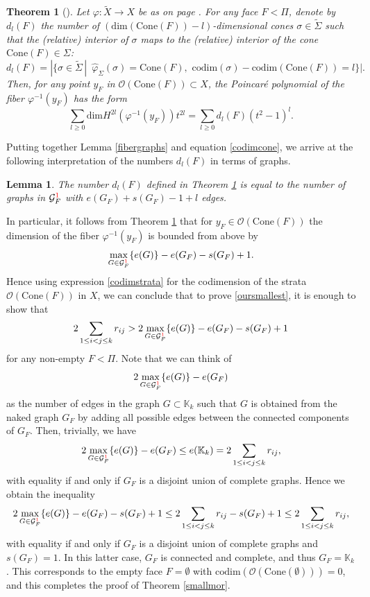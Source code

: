\documentclass[11pt]{article}
\newtheorem{theorem}[theo]{Theorem}
\newtheorem{lemma}[theo]{Lemma}
\theoremstyle{definition}
\numberwithin{equation}{section}
\newcommand{\cone}{\mathrm{Cone}}
\newcommand{\tilS}{\widetilde{\Sigma}}
\begin{document}
\begin{theorem}[{\cite[Corollary 4.7]{dCMMtor}}]\label{PoincareFib}
Let $\varphi: \widetilde{X}\to X$ be as on page \pageref{omitnot}. For any face 
$F<\Pi$, denote by
$d_l(F)$  the number of $(\mathrm{dim}(\cone(F))-l)$-dimensional cones 
$\sigma\in\tilS$ such that the (relative) interior of $\sigma$ maps to the 
(relative) interior of 
the cone $\cone(F)\in\Sigma$:
$$d_l(F) = |\{\sigma\in\tilS \, | \,\,\, 
\widehat{\varphi}_\Sigma(\sigma)=\cone(F), \,\, 
\mathrm{codim}(\sigma)-\mathrm{codim}(\cone(F))=l\}|.$$ 
Then, for any point  $y_F$ in $\mathcal{O}(\cone(F))\subset X$, the Poincar\'e 
polynomial of the fiber $\varphi^{-1}(y_F)$ has the form
$$\sum_{l\geq 0} \mathrm{dim}H^{2l}(\varphi^{-1}(y_F))t^{2l} = \sum_{l\geq 0} d_l(F)(t^2-1)^l. $$
\end{theorem}
Putting together Lemma \ref{fibergraphs} and equation \eqref{codimcone}, we arrive at the following interpretation of the numbers $d_l(F)$ in terms of graphs. 
\begin{lemma}\label{dlgraphs}
The number $d_l(F)$ defined in Theorem \ref{PoincareFib} is equal to the number 
of graphs in $\mathcal{G}^{\textcolor{red}{1}}_F$ with $e(G_F)+s(G_F)-1+l$ 
edges. 
\end{lemma}
In particular, it follows from Theorem \ref{PoincareFib} that for 
$y_F\in\mathcal{O}(\cone(F))$ the dimension of the fiber $\varphi^{-1}(y_F)$ is 
bounded from above by 
$$ \displaystyle{\max_{G\in\mathcal{G}^{\textcolor{red}{1}}_F}} \{e(G)\}-e(G_F)-s(G_F)+1. $$
Hence using expression \eqref{codimstrata} for the codimension of the strata
 $\mathcal{O}(\cone(F))$ in $X$, we can conclude that to prove 
\eqref{oursmallest}, it is enough to show that
\begin{equation} 
2\sum_{1\leq i< j\leq k}r_{ij} > \displaystyle{2\max_{G\in\mathcal{G}^{\textcolor{red}{1}}_F}} \{e(G)\} - e(G_F)-s(G_F)+1 
\end{equation}
for any non-empty $F<\Pi$. Note that we can think of 
$$\displaystyle{2\max_{G\in\mathcal{G}^{\textcolor{red}{1}}_F}} \{e(G)\} - 
e(G_F)$$ as the number of edges in the graph $G\subset\mathbb{K}_k$ such that 
$G$ is obtained from the naked graph $G_F$ by adding all possible edges between 
the connected components of $G_F$. Then,  trivially, we have
$$\displaystyle{2\max_{G\in\mathcal{G}^{\textcolor{red}{1}}_F}} \{e(G)\} - 
e(G_F) \leq e(\mathbb{K}_k) = 2\sum_{1\leq i< j\leq k}r_{ij},$$ with equality 
if and only if $G_F$ is a disjoint union of complete graphs. Hence we obtain 
the inequality  
$$\displaystyle{2\max_{G\in\mathcal{G}^{\textcolor{red}{1}}_F}} \{e(G)\} - e(G_F)-s(G_F)+1 \leq 2\sum_{1\leq i< j\leq k}r_{ij} - s(G_F)+1 \leq 2\sum_{1\leq i< j\leq k}r_{ij},$$
with equality if and only if $G_F$ is a disjoint union of complete graphs and 
$s(G_F)=1$. In this latter case, $G_F$ is connected and complete, and thus 
$G_F=\mathbb{K}_k$. This corresponds to the empty face $F=\emptyset$ with  
$\mathrm{codim}(\mathcal{O}(\cone(\emptyset))) = 0$, and this completes the 
proof of Theorem \ref{smallmor}. 
\end{document}
